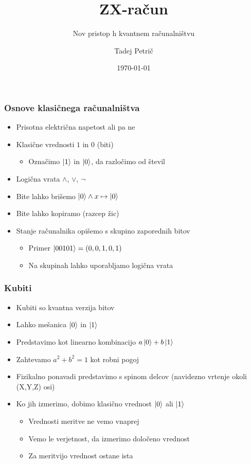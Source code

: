 \documentclass[10pt]{beamer}
\title{ZX-račun}
\subtitle{Nov pristop h kvantnem računalništvu}
\date{\today}
\author{Tadej Petrič}
\institute{Fakulteta za matematiko in fiziko}
\begin{document}
\begin{frame}
  \maketitle
\end{frame}
\begin{frame}
  \frametitle{Osnove klasičnega računalništva}
  \begin{itemize}
  \item Prisotna električna napetost ali pa ne
  \item Klasične vrednosti \(1\) in \(0\) (biti)
    \begin{itemize}
    \item Označimo \(\ket1\) in \(\ket0\), da razločimo od števil
    \end{itemize}
  \item Logična vrata \(\land\), \(\lor\), \(\lnot\)
  \item Bite lahko brišemo \(\ket0\land x \mapsto \ket0\)
  \item Bite lahko kopiramo (razcep žic)
  \item Stanje računalnika opišemo s skupino zaporednih bitov
    \begin{itemize}
    \item Primer \(\ket{00101} = (0,0,1,0,1)\)
    \item Na skupinah lahko uporabljamo logična vrata
    \end{itemize}
  \end{itemize}
\end{frame}
\begin{frame}
  \frametitle{Kubiti}
  \begin{itemize}
  \item Kubiti so kvantna verzija bitov
  \item Lahko mešanica \(\ket0\) in \(\ket1\)
  \item Predstavimo kot linearno kombinacijo \(a\ket0 + b\ket1\)
  \item Zahtevamo \(a^2+b^2 = 1\) kot robni pogoj
  \item Fizikalno ponavadi predstavimo s spinom delcov (navidezno vrtenje okoli (X,Y,Z) osi)
  \item Ko jih izmerimo, dobimo klasično vrednost \(\ket0\) ali \(\ket1\)\pause
    \begin{itemize}
    \item Vrednosti meritve ne vemo vnaprej
    \item Vemo le verjetnost, da izmerimo določeno vrednost
    \item Za meritvijo vrednost ostane ista
    \end{itemize}
  \end{itemize}
\end{frame}
\end{document}
